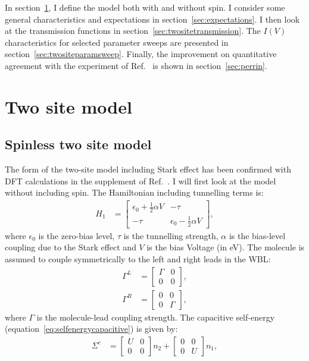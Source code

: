 In section~\ref{sec:twosite}, I define the model both with and without spin. I consider some general characteristics and expectations in section~\ref{sec:expectations}. I then look at the transmission functions in section~\ref{sec:twositetransmission}. The $I(V)$ characteristics for selected parameter sweeps are presented in section~\ref{sec:twositeparamsweep}. Finally, the improvement on quantitative agreement with the experiment of Ref.~\cite{perrinnano} is shown in section~\ref{sec:perrin}.


\section{Two site model} 
\label{sec:twosite}
\subsection{Spinless two site model}
The form of the two-site model including Stark effect has been confirmed with DFT calculations in the supplement of Ref.~\cite{perrinnano}. I  will first look at the model without including spin. The Hamiltonian including tunnelling terms is:
\begin{align}
H_1 &= \begin{bmatrix} \epsilon_0 + \frac{1}{2} \alpha V & -\tau \\
-\tau & \epsilon_0 - \frac{1}{2} \alpha V\end{bmatrix},
\label{eq:spinlesshamiltonian}
\end{align}
where $\epsilon_0$ is the zero-bias level, $\tau$ is the tunnelling strength, $\alpha$ is the bias-level coupling due to the Stark effect and $V$ is the bias Voltage (in eV). The molecule is assumed to couple symmetrically to the left and right leads in the WBL:
\begin{align*}
\Gamma^L &= \begin{bmatrix} \Gamma & 0 \\ 0 & 0 \end{bmatrix},\\ \Gamma^R &= \begin{bmatrix} 0 & 0 \\ 0 & \Gamma \end{bmatrix},
\end{align*}
where $\Gamma$ is the molecule-lead coupling strength. The capacitive self-energy (equation~\ref{eq:selfenergycapacitive}) is given by:
\begin{align*}
\Sigma^c &= \begin{bmatrix} U & 0 \\ 0 & 0 \end{bmatrix} n_2 + \begin{bmatrix} 0 & 0 \\ 0 & U \end{bmatrix} n_1,
\end{align*}
